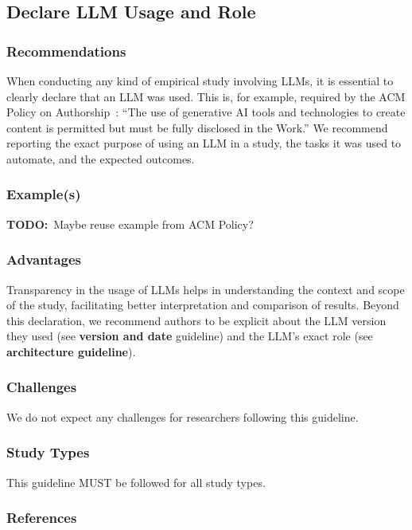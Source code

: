 \documentclass[11pt]{article}
\newcommand{\todo}[1]{{\textbf{TODO:}\ {#1}}} %
\begin{document}
\subsection{Declare LLM Usage and Role}

\subsubsection{Recommendations}

When conducting any kind of empirical study involving LLMs, it is essential to clearly declare that an LLM was used.
This is, for example, required by the ACM Policy on Authorship~\cite{ACM2023}: ``The use of generative AI tools and technologies to create content is permitted but must be fully disclosed in the Work.''
We recommend reporting the exact purpose of using an LLM in a study, the tasks it was used to automate, and the expected outcomes.

\subsubsection{Example(s)}

\todo{Maybe reuse example from ACM Policy?}

\subsubsection{Advantages}

Transparency in the usage of LLMs helps in understanding the context and scope of the study, facilitating better interpretation and comparison of results.
Beyond this declaration, we recommend authors to be explicit about the LLM version they used (see \textbf{version and date} guideline) and the LLM's exact role (see \textbf{architecture guideline}).

\subsubsection{Challenges}

We do not expect any challenges for researchers following this guideline.

\subsubsection{Study Types}

This guideline MUST be followed for all study types.

\subsubsection{References}



\end{document}
